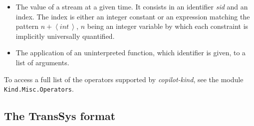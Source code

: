 \begin{itemize}
\item The value of a stream at a given time. It consists in an identifier \textit{sid} and an index. The index is either an integer constant or an expression matching the pattern $ \textit{n} +  \left< \textit{int} \,  \right> $, $n$ being an integer variable by which each constraint is implicitly universally quantified.

\item The application of an uninterpreted function, which identifier is given, to a list of arguments.
\end{itemize}
To access a full list of the operators supported by \textit{copilot-kind}, see the module \texttt{Kind.Misc.Operators}.

\subsection{The \textbf{TransSys} format}




